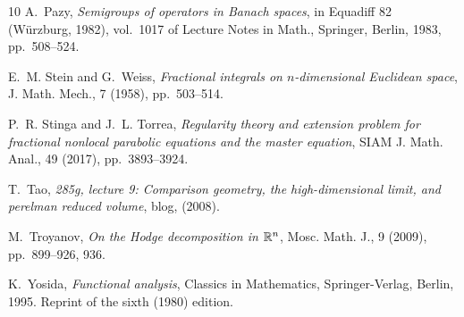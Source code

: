 \documentclass[11pt, twoside, notitlepage]{amsart}
\numberwithin{equation}{section}
\begin{document}
\begin{thebibliography}{10}
{\sc A.~Pazy}, {\em Semigroups of operators in {B}anach spaces}, in Equadiff 82
  ({W}\"urzburg, 1982), vol.~1017 of Lecture Notes in Math., Springer, Berlin,
  1983, pp.~508--524.

{\sc E.~M. Stein and G.~Weiss}, {\em Fractional integrals on {$n$}-dimensional
  {E}uclidean space}, J. Math. Mech., 7 (1958), pp.~503--514.

{\sc P.~R. Stinga and J.~L. Torrea}, {\em Regularity theory and extension
  problem for fractional nonlocal parabolic equations and the master equation},
  SIAM J. Math. Anal., 49 (2017), pp.~3893--3924.

{\sc T.~Tao}, {\em 285g, lecture 9: Comparison geometry, the high-dimensional
  limit, and perelman reduced volume}, blog,  (2008).

{\sc M.~Troyanov}, {\em On the {H}odge decomposition in {$\Bbb R^n$}}, Mosc.
  Math. J., 9 (2009), pp.~899--926, 936.

{\sc K.~Yosida}, {\em Functional analysis}, Classics in Mathematics,
  Springer-Verlag, Berlin, 1995.
\newblock Reprint of the sixth (1980) edition.

\end{thebibliography}
\end{document}
